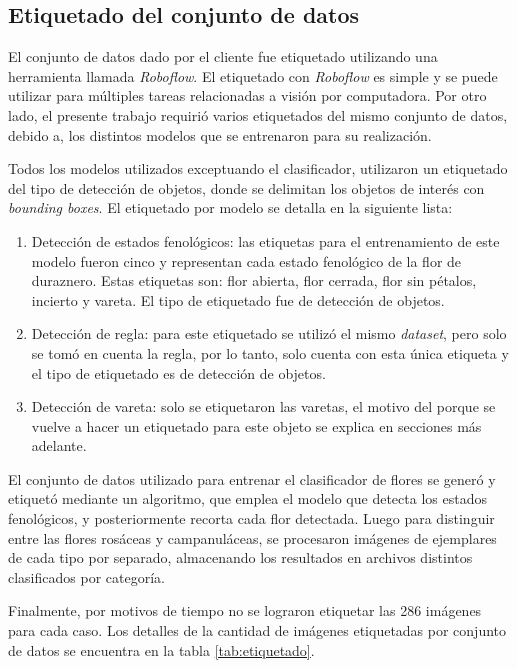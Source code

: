 \subsection{Etiquetado del conjunto de datos}

El conjunto de datos dado por el cliente fue etiquetado utilizando una herramienta llamada \textit{Roboflow}. El etiquetado con \textit{Roboflow} es simple y se puede utilizar para múltiples tareas relacionadas a visión por computadora. Por otro lado, el presente trabajo requirió varios etiquetados del mismo conjunto de datos, debido a, los distintos modelos que se entrenaron para su realización.

Todos los modelos utilizados exceptuando el clasificador, utilizaron un etiquetado del tipo de detección de objetos, donde se delimitan los objetos de interés con \textit{bounding boxes}. El etiquetado por modelo se detalla en la siguiente lista:

\begin{enumerate}
	\item Detección de estados fenológicos: las etiquetas para el entrenamiento de este modelo fueron cinco y representan cada estado fenológico de la flor de duraznero. Estas etiquetas son: flor abierta, flor cerrada, flor sin pétalos, incierto y vareta. El tipo de etiquetado fue de detección de objetos.
	\item Detección de regla: para este etiquetado se utilizó el mismo \textit{dataset}, pero solo se tomó en cuenta la regla, por lo tanto, solo cuenta con esta única etiqueta y el tipo de etiquetado es de detección de objetos.
	\item Detección de vareta: solo se etiquetaron las varetas, el motivo del porque se vuelve a hacer un etiquetado para este objeto se explica en secciones más adelante.
\end{enumerate}

El conjunto de datos utilizado para entrenar el clasificador de flores se generó y etiquetó mediante un algoritmo, que emplea el modelo que detecta los estados fenológicos, y posteriormente recorta cada flor detectada. Luego para distinguir entre las flores rosáceas y campanuláceas, se procesaron imágenes de ejemplares de cada tipo por separado, almacenando los resultados en archivos distintos clasificados por categoría.

Finalmente, por motivos de tiempo no se lograron etiquetar las 286 imágenes para cada caso. Los detalles de la cantidad de imágenes etiquetadas por conjunto de datos se encuentra en la tabla \ref{tab:etiquetado}. 

